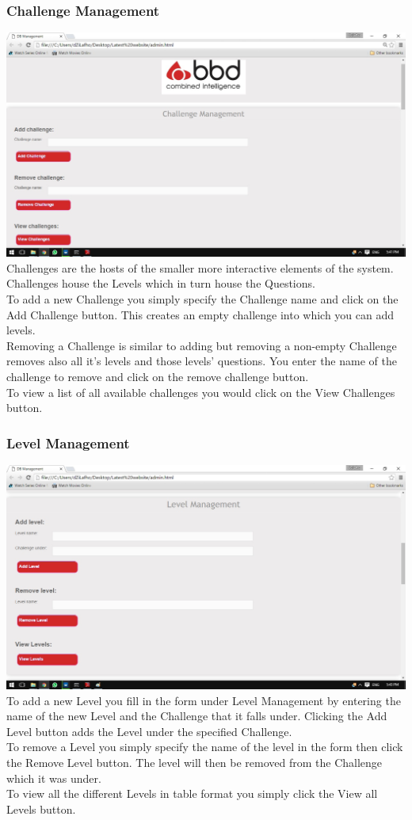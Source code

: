 \documentclass[english]{article}
\begin{document}
			\subsubsection{Challenge Management}
				\includegraphics[width=\linewidth]{challengeManagement.jpg}
				Challenges are the hosts of the smaller more interactive elements of the system. Challenges house the Levels which in turn house the Questions.
				\\[12pt]
				To add a new Challenge you simply specify the Challenge name and click on the Add Challenge button. This creates an  empty challenge into which you can add levels.
				\\[12pt]
				Removing a Challenge is similar to adding but removing a non-empty Challenge removes also all it's levels and those levels' questions. You enter the name of the challenge to remove and click on the remove challenge button.
				\\[12pt]
				To view a list of all available challenges you would click on the View Challenges button.
			\subsubsection{Level Management}
				\includegraphics[width=\linewidth]{levelManagement.jpg}
				To add a new Level you fill in the form under Level Management by entering the name of the new Level and the Challenge that it falls under. Clicking the Add Level button adds the Level under the specified Challenge.
				\\[12pt]
				To remove a Level you simply specify the name of the level in the form then click the Remove Level button. The level will then be removed from the Challenge which it was under.
				\\[12pt]
				To view all the different Levels in table format you simply click the View all Levels button.
\end{document}
